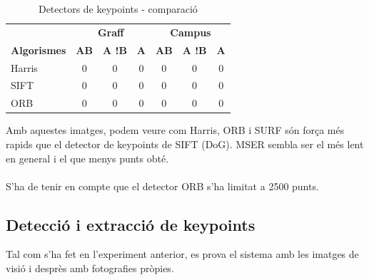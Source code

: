		\begin{table}[H]
			\begin{center}
				\begin{tabular}{l | c c c | c c c}
					& \multicolumn{3}{c|}{\textbf{Graff}} & \multicolumn{3}{c}{\textbf{Campus}}\\
					\textbf{Algorismes} & \textbf{AB} & \textbf{A !B} & \textbf{A} & \textbf{AB} & \textbf{A !B} & \textbf{A} \\ \hline
					Harris & 0 & 0 & 0 & 0 & 0 & 0 \\
					SIFT & 0 & 0 & 0 & 0 & 0 & 0 \\
					ORB & 0 & 0 & 0 & 0 & 0 & 0 \\
				\end{tabular}
			\end{center}
			\caption{Detectors de keypoints - comparació}
		\end{table}
		\noindent
		Amb aquestes imatges, podem veure com Harris, ORB i SURF són força més rapids que el detector de keypoints de SIFT (DoG). MSER sembla ser el més lent en general i el que menys punts obté.\\\\
		S'ha de tenir en compte que el detector ORB s'ha limitat a 2500 punts.\\
\newpage










\newpage
	\subsection{Detecció i extracció de keypoints}
		Tal com s'ha fet en l'experiment anterior, es prova el sistema amb les imatges de visió i desprès amb fotografies pròpies.

